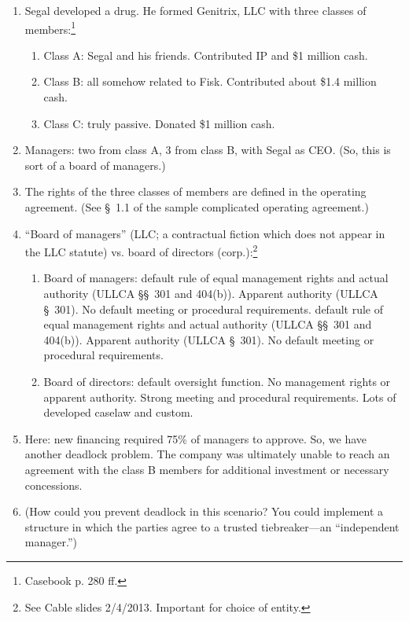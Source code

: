 \begin{enumerate}
    \item Segal developed a drug. He formed Genitrix, LLC with three classes of 
    members:\footnote{Casebook p. 280 ff.}
    \begin{enumerate}
        \item Class A: Segal and his friends. Contributed IP and \$1 million cash.
        \item Class B: all somehow related to Fisk. Contributed about \$1.4 
        million cash.
        \item Class C: truly passive. Donated \$1 million cash.
    \end{enumerate}
    \item Managers: two from class A, 3 from class B, with Segal as CEO. (So, 
    this is sort of a board of managers.)
    \item The rights of the three classes of members are defined in the 
    operating agreement. (See \S\ 1.1 of the sample complicated operating 
    agreement.)
    \item ``Board of managers'' (LLC; a contractual fiction which does not 
    appear in the LLC statute) vs. board of directors (corp.):\footnote{See 
    Cable slides 2/4/2013. Important for choice of entity.}
    \begin{enumerate}
        \item Board of managers: default rule of equal management rights and 
        actual authority (ULLCA \S\S\ 301 and 404(b)). Apparent authority 
        (ULLCA \S\ 301). No default meeting or procedural requirements.
        default rule of equal management rights and 
        actual authority (ULLCA \S\S\ 301 and 404(b)). Apparent authority 
        (ULLCA \S\ 301). No default meeting or procedural requirements.
        \item Board of directors: default oversight function. No management 
        rights or apparent authority. Strong meeting and procedural 
        requirements. Lots of developed caselaw and custom.
    \end{enumerate}
    \item Here: new financing required 75\% of managers to approve. So, we 
    have another deadlock problem. The company was ultimately unable to reach 
    an agreement with the class B members for additional investment or 
    necessary concessions.
    \item (How could you prevent deadlock in this scenario? You could 
    implement a structure in which the parties agree to a trusted 
    tiebreaker---an ``independent manager.'')
\end{enumerate}

